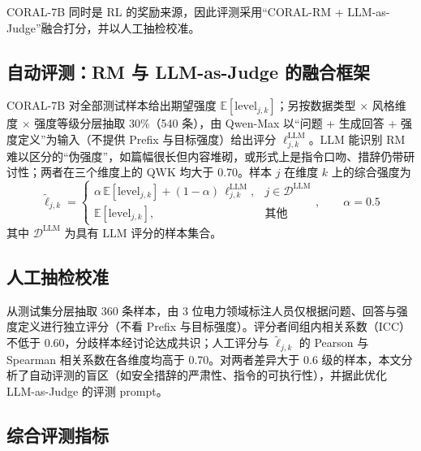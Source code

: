 \documentclass[fontset=fandol,type=master,campus=shenzhen,etitleauto=true]{hithesisbook}
\begin{document}
CORAL-7B 同时是 RL 的奖励来源，因此评测采用“CORAL-RM + LLM-as-Judge”融合打分，并以人工抽检校准。

\subsection{自动评测：RM 与 LLM-as-Judge 的融合框架}\label{ux81eaux52a8ux8bc4ux6d4b}

CORAL-7B 对全部测试样本给出期望强度 $\mathbb{E}[\text{level}_{j,k}]$；另按数据类型 × 风格维度 × 强度等级分层抽取 30\%（540 条），由 Qwen-Max 以“问题 + 生成回答 + 强度定义”为输入（不提供 Prefix 与目标强度）给出评分 $\ell^{\text{LLM}}_{j,k}$。LLM 能识别 RM 难以区分的“伪强度”，如篇幅很长但内容堆砌，或形式上是指令口吻、措辞仍带研讨性；两者在三个维度上的 QWK 均大于 0.70。样本 $j$ 在维度 $k$ 上的综合强度为
\begin{equation}\label{eq:fused-level}
\tilde{\ell}_{j,k} = \begin{cases} \alpha\, \mathbb{E}[\text{level}_{j,k}] + (1 - \alpha)\, \ell^{\text{LLM}}_{j,k}, & j \in \mathcal{D}^{\text{LLM}} \\ \mathbb{E}[\text{level}_{j,k}], & \text{其他} \end{cases}, \qquad \alpha = 0.5
\end{equation}
其中 $\mathcal{D}^{\text{LLM}}$ 为具有 LLM 评分的样本集合。

\subsection{人工抽检校准}\label{ux4ebaux5de5ux62bdux68c0ux6821ux51c6}

从测试集分层抽取 360 条样本，由 3 位电力领域标注人员仅根据问题、回答与强度定义进行独立评分（不看 Prefix 与目标强度）。评分者间组内相关系数（ICC）\cite{ref76}不低于 0.60，分歧样本经讨论达成共识；人工评分与 $\tilde{\ell}_{j,k}$ 的 Pearson 与 Spearman 相关系数在各维度均高于 0.70。对两者差异大于 0.6 级的样本，本文分析了自动评测的盲区（如安全措辞的严肃性、指令的可执行性），并据此优化 LLM-as-Judge 的评测 prompt。

\subsection{综合评测指标}\label{ux7efcux5408ux8bc4ux6d4bux6307ux6807}
\end{document}
